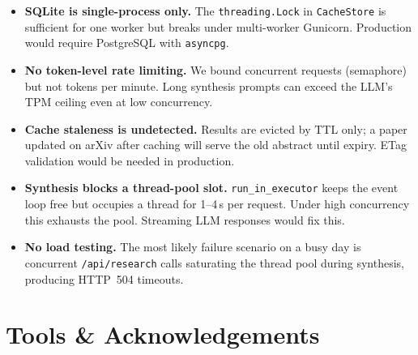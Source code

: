 \documentclass[11pt,a4paper]{article}
\begin{document}
\begin{itemize}[leftmargin=1.2em,itemsep=4pt]
  \item \textbf{SQLite is single-process only.} The \texttt{threading.Lock} in \texttt{CacheStore} is sufficient for one worker but breaks under multi-worker Gunicorn. Production would require PostgreSQL with \texttt{asyncpg}.
  \item \textbf{No token-level rate limiting.} We bound concurrent requests (semaphore) but not tokens per minute. Long synthesis prompts can exceed the LLM's TPM ceiling even at low concurrency.
  \item \textbf{Cache staleness is undetected.} Results are evicted by TTL only; a paper updated on arXiv after caching will serve the old abstract until expiry. ETag validation would be needed in production.
  \item \textbf{Synthesis blocks a thread-pool slot.} \texttt{run\_in\_executor} keeps the event loop free but occupies a thread for 1--4\,s per request. Under high concurrency this exhausts the pool. Streaming LLM responses would fix this.
  \item \textbf{No load testing.} The most likely failure scenario on a busy day is concurrent \texttt{/api/research} calls saturating the thread pool during synthesis, producing HTTP~504 timeouts.
\end{itemize}

\section{Tools \& Acknowledgements}\label{sec:tools}
\end{document}
